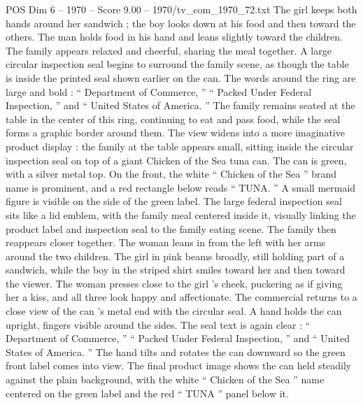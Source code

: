 \begin{textsample}{POS Dim 6 – 1970 – Score 9.00 – 1970/tv\_com\_1970\_72.txt}
The girl keeps both hands around her sandwich ; the boy looks down at his food and then toward the others.
The man holds food in his hand and leans slightly toward the children.
The family appears relaxed and cheerful, sharing the meal together.
A large circular inspection seal begins to surround the family scene, as though the table is inside the printed seal shown earlier on the can.
The words around the ring are large and bold : “ Department of Commerce, ” “ Packed Under Federal Inspection, ” and “ United States of America. ” The family remains seated at the table in the center of this ring, continuing to eat and pass food, while the seal forms a graphic border around them.
The view widens into a more imaginative product display : the family at the table appears small, sitting inside the circular inspection seal on top of a giant Chicken of the Sea tuna can.
The can is green, with a silver metal top.
On the front, the white “ Chicken of the Sea ” brand name is prominent, and a red rectangle below reads “ TUNA. ” A small mermaid figure is visible on the side of the green label.
The large federal inspection seal sits like a lid emblem, with the family meal centered inside it, visually linking the product label and inspection seal to the family eating scene.
The family then reappears closer together.
The woman leans in from the left with her arms around the two children.
The girl in pink beams broadly, still holding part of a sandwich, while the boy in the striped shirt smiles toward her and then toward the viewer.
The woman presses close to the girl ’s cheek, puckering as if giving her a kiss, and all three look happy and affectionate.
The commercial returns to a close view of the can ’s metal end with the circular seal.
A hand holds the can upright, fingers visible around the sides.
The seal text is again clear : “ Department of Commerce, ” “ Packed Under Federal Inspection, ” and “ United States of America. ” The hand tilts and rotates the can downward so the green front label comes into view.
The final product image shows the can held steadily against the plain background, with the white “ Chicken of the Sea ” name centered on the green label and the red “ TUNA ” panel below it.

\end{textsample}
